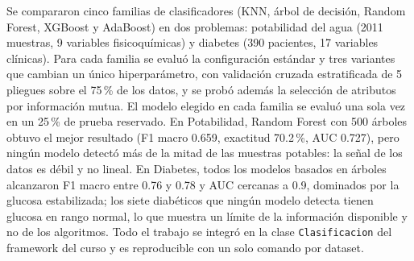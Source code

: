 Se compararon cinco familias de clasificadores (KNN, árbol de decisión, Random
Forest, XGBoost y AdaBoost) en dos problemas: potabilidad del agua (2011 muestras,
9 variables fisicoquímicas) y diabetes (390 pacientes, 17 variables clínicas). Para
cada familia se evaluó la configuración estándar y tres variantes que cambian un
único hiperparámetro, con validación cruzada estratificada de 5 pliegues sobre el
75\,\% de los datos, y se probó además la selección de atributos por información
mutua. El modelo elegido en cada familia se evaluó una sola vez en un 25\,\% de
prueba reservado. En Potabilidad, Random Forest con 500 árboles obtuvo el mejor
resultado (F1 macro 0.659, exactitud 70.2\,\%, AUC 0.727), pero ningún modelo
detectó más de la mitad de las muestras potables: la señal de los datos es débil y
no lineal. En Diabetes, todos los modelos basados en árboles alcanzaron F1 macro
entre 0.76 y 0.78 y AUC cercanas a 0.9, dominados por la glucosa estabilizada; los
siete diabéticos que ningún modelo detecta tienen glucosa en rango normal, lo que
muestra un límite de la información disponible y no de los algoritmos. Todo el
trabajo se integró en la clase \texttt{Clasificacion} del framework del curso y es
reproducible con un solo comando por dataset.

